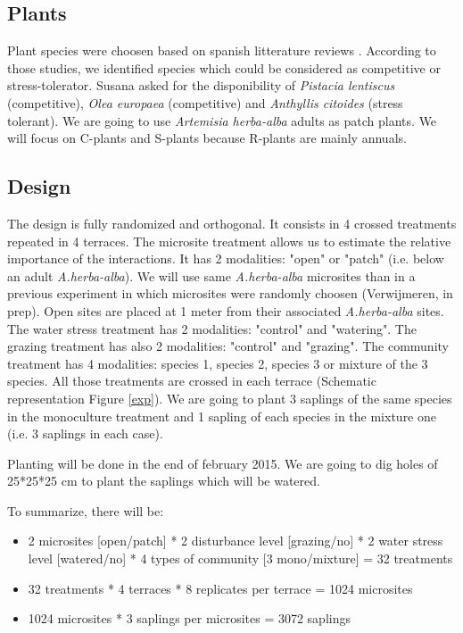 \documentclass[12pt]{article} %
\begin{document}
\subsection{Plants}
Plant species were choosen based on spanish litterature reviews \citep{McCluney2012,Navarro2006, Jauffret2003}. According to those studies, we identified species which could be considered as competitive or stress-tolerator. Susana asked for the disponibility of \textit{Pistacia lentiscus} (competitive), \textit{Olea europaea} (competitive) and \textit{Anthyllis citoides} (stress tolerant). We are going to use \textit{Artemisia herba-alba} adults as patch plants. We will focus on C-plants and S-plants because R-plants are mainly annuals.

\subsection{Design}
The design is fully randomized and orthogonal. It consists in 4 crossed treatments repeated in 4 terraces. The microsite treatment allows us to estimate the relative importance of the interactions. It has 2 modalities: "open" or "patch" (i.e. below an adult \textit{A.herba-alba}). We will use same \textit{A.herba-alba} microsites than in a previous experiment in which microsites were randomly choosen (Verwijmeren, in prep). Open sites are placed at 1 meter from their associated \textit{A.herba-alba} sites. The water stress treatment has 2 modalities: "control" and "watering". The grazing treatment has also 2 modalities: "control" and "grazing". The community treatment has 4 modalities: species 1, species 2, species 3 or mixture of the 3 species. All those treatments are crossed in each terrace (Schematic representation Figure \ref{exp}). We are going to plant 3 saplings of the same species in the monoculture treatment and 1 sapling of each species in the mixture one (i.e. 3 saplings in each case).

Planting will be done in the end of february 2015. We are going to dig holes of 25*25*25 cm to plant the saplings which will be watered.

To summarize, there will be:
\begin{itemize} %
\item 2 microsites [open/patch] * 2 disturbance level [grazing/no] * 2 water stress level [watered/no] * 4 types of community [3 mono/mixture] = 32 treatments
\item 32 treatments * 4 terraces * 8 replicates per terrace = 1024 microsites
\item 1024 microsites * 3 saplings per microsites = 3072 saplings 
\end{itemize}
\end{document}
